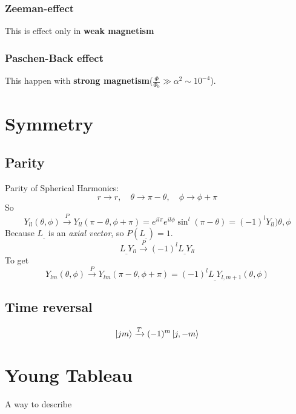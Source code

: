\subsubsection{Zeeman-effect}
This is effect only in \textbf{weak magnetism}

\subsubsection{Paschen-Back effect}
This happen with \textbf{strong magnetism}($\frac{\Phi}{\Phi_0}\gg\alpha^2\sim10^{-4}$).


\section{Symmetry}

\subsection{Parity} 
Parity of Spherical Harmonics:
\[
    r\rightarrow{}r,\quad\theta\rightarrow\pi-\theta,\quad\phi\rightarrow\phi+\pi
    \]
So
\[
    Y_{ll}(\theta,\phi)\xrightarrow{P}Y_{ll}(\pi-\theta,\phi+\pi)=e^{il\pi}e^{il\phi}\sin^l(\pi-\theta)=(-1)^{l}Y_{ll})\theta,\phi
    \]
Because $L_\_$ is an \emph{axial vector}, so $P(L_\_)=1$.
\[
    L_\_Y_{ll}\xrightarrow{P}(-1)^{l}L_\_Y_{ll}
    \]
To get
\[
    Y_{lm}(\theta,\phi)\xrightarrow{P}Y_{lm}(\pi-\theta,\phi+\pi)=(-1)^{l}L_\_Y_{l,m+1}(\theta,\phi)
    \]

\subsection{Time reversal}
\[
    \ket{jm}\xrightarrow{T}(-1)^m\ket{j,-m}
    \]


\section{Young Tableau}
A way to describe 
